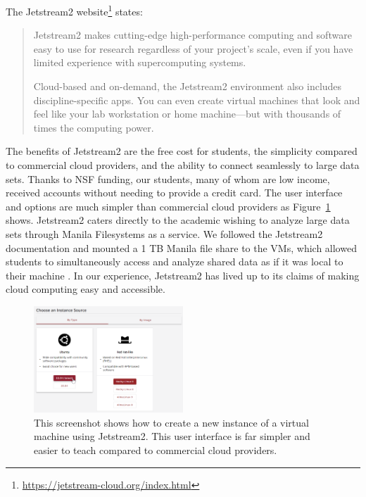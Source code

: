 \documentclass[12pt]{article}
\begin{document}
The Jetstream2 website\footnote{\url{https://jetstream-cloud.org/index.html}} states:
\begin{quote}
Jetstream2 makes cutting-edge high-performance computing and software easy to use for research regardless of your project’s scale, even if you have limited experience with supercomputing systems.

Cloud-based and on-demand, the Jetstream2 environment also includes discipline-specific apps. You can even create virtual machines that look and feel like your lab workstation or home machine—but with thousands of times the computing power.
\end{quote}

The benefits of Jetstream2 are the free cost for students, the simplicity compared to commercial cloud providers, and the ability to connect seamlessly to large data sets.
Thanks to NSF funding, our students, many of whom are low income, received accounts without needing to provide a credit card.
The user interface and options are much simpler than commercial cloud providers as Figure~\ref{fig:jetstream} shows. 
Jetstream2 caters directly to the academic wishing to analyze large data sets through Manila Filesystems as a service.
We followed the Jetstream2 documentation and mounted a 1 TB Manila file share to the VMs, which allowed students to simultaneously access and analyze shared data as if it was local to their machine \cite{manila}.
In our experience, Jetstream2 has lived up to its claims of making cloud computing easy and accessible.

\begin{figure}[h]
    \centering
    \includegraphics[width=0.5\textwidth]{jetstream}
    \caption{This screenshot shows how to create a new instance of a virtual machine using Jetstream2.
This user interface is far simpler and easier to teach compared to commercial cloud providers.}
    \label{fig:jetstream}
\end{figure}
\end{document}
